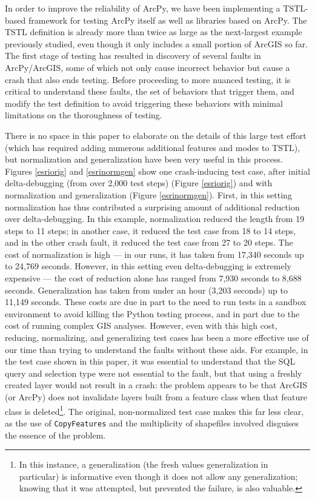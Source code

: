 In order to improve the reliability of ArcPy, we have been
implementing a TSTL-based framework for testing ArcPy itself as well
as libraries based on ArcPy.  The TSTL definition is already more than
twice as large as the next-largest example previously studied, even
though it only includes a small portion of ArcGIS so far. The first
stage of testing has resulted in discovery of several faults in
ArcPy/ArcGIS, some of which not only cause incorrect behavior but
cause a crash that also ends testing.  Before proceeding to more
nuanced testing, it is critical to understand these faults, the set of
behaviors that trigger them, and modify the test definition to avoid
triggering these behaviors with minimal limitations on the thoroughness
of testing.

There is no space in this paper to elaborate on the details of
this large test effort (which has required adding numerous additional
features and modes to TSTL), but normalization and generalization have been very useful in
this process.  Figures \ref{esriorig} and \ref{esrinormgen} show one
crash-inducing test case, after initial delta-debugging (from over
2,000 test steps) (Figure \ref{esriorig}) and with normalization and
generalization (Figure \ref{esrinormgen}).  First, in this setting
normalization has thus contributed a surprising amount of additional
reduction over delta-debugging.  In this example, normalization
reduced the length from 19 steps to 11 steps; in another case, it
reduced the test case from 18 to 14 steps, and in the other crash
fault, it reduced the test case from 27 to 20 steps.  The cost of
normalization is high --- in our runs, it has taken from 17,340
seconds up to 24,769 seconds.  However, in this setting even
delta-debugging is extremely expensive --- the cost of reduction alone
has ranged from 7,930 seconds to 8,688 seconds.  Generalization has
taken from under an hour (3,203 seconds) up to 11,149 seconds.  These
costs are due in part to the need to run tests in a sandbox
environment to avoid killing the Python testing process, and in part
due to the cost of running complex GIS analyses.  However, even with
this high cost, reducing, normalizing, and generalizing test cases has
been a more effective use of our time than trying to understand the
faults without these aids.  For example, in the test case shown in
this paper, it was essential to understand that the SQL query and
selection type were not essential to the fault, but that using a
freshly created layer would not result in a crash:  the problem
appears to be that ArcGIS (or ArcPy) does not invalidate layers built
from a feature class when that feature class is deleted\footnote{In
  this instance, a generalization (the fresh values generalization in
  particular) is informative even though it does not allow any
  generalization; knowing that it was attempted, but prevented the
  failure, is also valuable.}.  The
original, non-normalized test case makes this far less clear, as the
use of {\tt CopyFeatures} and the multiplicity of shapefiles involved
disguises the essence of the problem.

